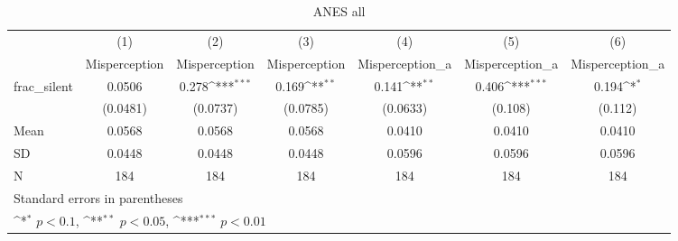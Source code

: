 \begin{table}[htbp]\centering
\def\sym#1{\ifmmode^{#1}\else\(^{#1}\)\fi}
\caption{ANES all}
\begin{tabular}{l*{6}{c}}
\hline\hline
                                &\multicolumn{1}{c}{(1)}&\multicolumn{1}{c}{(2)}&\multicolumn{1}{c}{(3)}&\multicolumn{1}{c}{(4)}&\multicolumn{1}{c}{(5)}&\multicolumn{1}{c}{(6)}\\
                                &\multicolumn{1}{c}{Misperception}&\multicolumn{1}{c}{Misperception}&\multicolumn{1}{c}{Misperception}&\multicolumn{1}{c}{Misperception\_a}&\multicolumn{1}{c}{Misperception\_a}&\multicolumn{1}{c}{Misperception\_a}\\
\hline
frac\_silent                     &   0.0506         &    0.278\sym{***}&    0.169\sym{**} &    0.141\sym{**} &    0.406\sym{***}&    0.194\sym{*}  \\
                                & (0.0481)         & (0.0737)         & (0.0785)         & (0.0633)         &  (0.108)         &  (0.112)         \\
\hline
Mean                            &   0.0568         &   0.0568         &   0.0568         &   0.0410         &   0.0410         &   0.0410         \\
SD                              &   0.0448         &   0.0448         &   0.0448         &   0.0596         &   0.0596         &   0.0596         \\
N                               &      184         &      184         &      184         &      184         &      184         &      184         \\
\hline\hline
\multicolumn{7}{l}{\footnotesize Standard errors in parentheses}\\
\multicolumn{7}{l}{\footnotesize \sym{*} \(p<0.1\), \sym{**} \(p<0.05\), \sym{***} \(p<0.01\)}\\
\end{tabular}
\end{table}
